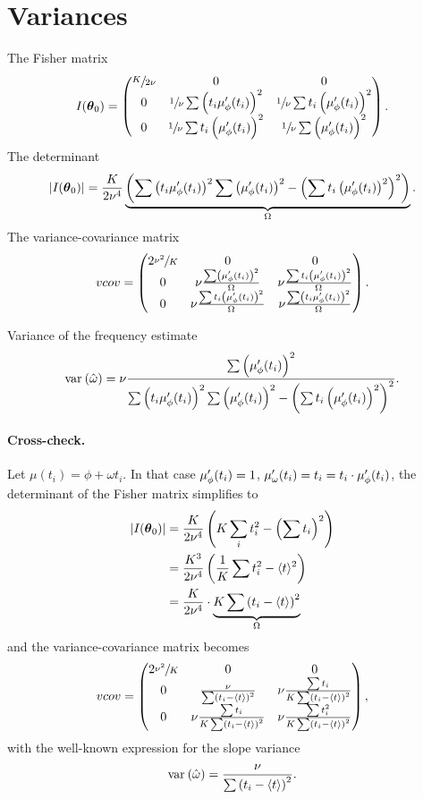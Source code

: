 \documentclass{article}
\begin{document}
\section{Variances}

The Fisher matrix
\[
	\Fisher = \begin{pmatrix}
	\sfrac{K}{2\nu} & 0 								& 0 \\
	0 				& \sfrac1\nu\sum\bkt{t_i\mupp}^2	& \sfrac1\nu\sum t_i\bkt{\mupp}^2 \\
	0				& \sfrac1\nu\sum t_i\bkt{\mupp}^2	&\sfrac1\nu\sum\bkt{\mupp}^2
	\end{pmatrix}.
\]
The determinant
\newcommand{\STM}{\Omega}
\[
	|\Fisher| = \frac{K}{2\nu^4}\underbrace{\bkt{\sum\bkt{t_i\mupp}^2\sum\bkt{\mupp}^2 - \bkt{\sum t_i\bkt{\mupp}^2}^2}}_{\STM}.
\]
The variance-covariance matrix
\[
vcov = \begin{pmatrix}
	2\sfrac{\nu^2}{K}& 0									& 0				\\
	0				&\nu\frac{\sum\bkt{\mupp}^2}{\STM}		&\nu\frac{\sum t_i\bkt{\mupp}^2}{\STM}\\
	0				&\nu\frac{\sum t_i\bkt{\mupp}^2}{\STM}	&\nu\frac{\sum\bkt{t_i\mupp}^2}{\STM}
\end{pmatrix}.
\]

Variance of the frequency estimate
\begin{equation}\label{eq:Var1}
	\var{\hat{\omega}} = \nu\frac{\sum\bkt{\mupp}^2}{\sum\bkt{t_i\mupp}^2\sum\bkt{\mupp}^2 - \bkt{\sum t_i\bkt{\mupp}^2}^2}.
\end{equation}

\newcommand{\avg}[1]{\langle #1\rangle}
\paragraph{Cross-check.} Let $\mu(t_i) = \phi + \omega t_i$. In that case $\mupp = 1$, $\mu'_\omega(t_i) = t_i = t_i\cdot\mupp$, the determinant of the Fisher matrix simplifies to 
\begin{align*}
	|\Fisher| &= \frac{K}{2\nu^4}\bkt{K\sum_i t_i^2 - \bkt{\sum t_i}^2} \\
				 &= \frac{K^3}{2\nu^4}\bkt{\frac1K\sum t_i^2 - \avg{t}^2} \\
				 &= \frac{K}{2\nu^4}\cdot\underbrace{K\sum\bkt{t_i - \avg{t}}^2}_{\STM}
\end{align*}
\newcommand{\SSX}{\sum\bkt{t_i - \avg{t}}^2}
and the variance-covariance matrix becomes
\[
vcov = \begin{pmatrix}
	2\sfrac{\nu^2}{K}& 0									& 0				\\
	0				&\frac{\nu}{\SSX}		&\nu\frac{\sum t_i}{K\SSX}\\
	0				&\nu\frac{\sum t_i}{K\SSX}	&\nu\frac{\sum t_i^2}{K\SSX}
\end{pmatrix},
\]
with the well-known expression for the slope variance
\[
	\var{\hat\omega} = \frac{\nu}{\SSX}.
\]
\end{document}
